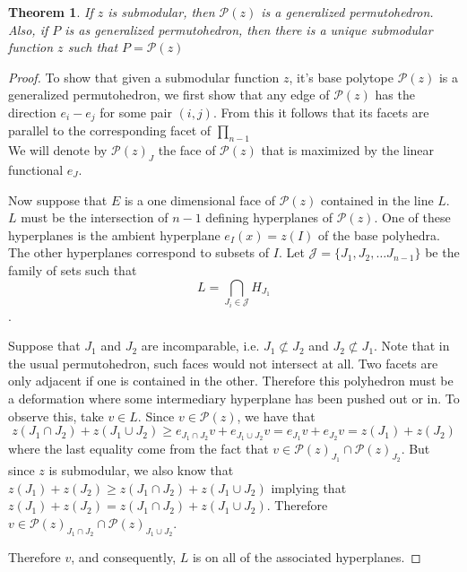 \documentclass[12pt]{amsart}
\newtheorem{theorem}[lemma]{Theorem}
\numberwithin{equation}{section}
\newcommand{\pp}{\mathcal{P}}
\newcommand{\J}{\mathcal{J}}
\newcommand{\jr}[1]{{\color{brown} \sf $\clubsuit\clubsuit\clubsuit$ JR: [#1]}}
\begin{document}
\begin{theorem}
\label{theorem:submodularity}
 If $z$ is submodular, then $\pp(z)$ is a generalized permutohedron.  Also, if $P$ is as generalized permutohedron, then there
is a unique submodular function $z$ such that $P=\pp(z)$ 
\end{theorem}

\begin{proof}

To show that given a submodular function $z$, it's base polytope $\mathcal{P}(z)$ is a generalized permutohedron, 
we first show that any edge of $\mathcal{P}(z)$ has the direction $e_i-e_j$ for some pair $(i,j)$.  From this it follows that its facets are parallel 
to the corresponding facet of $\prod_{n-1}$ \\


  We will denote by $\mathcal{P}(z)_J$
the face of $\mathcal{P}(z)$ that is maximized by the linear functional $e_J$.  

Now suppose that $E$ is a one dimensional face of $\mathcal{P}(z)$ contained in the line $L$.   
$L$ must be the intersection of $n-1$ defining hyperplanes
 of $\mathcal{P}(z)$.   One of these hyperplanes is the ambient hyperplane $e_I( x) = z(I)$ of the base polyhedra.  The other hyperplanes correspond to subsets of $I$.  Let $\mathcal{J} = \{ J_1, J_2, \dots J_{n-1}\} $ be the family of sets such that 
$$L = \bigcap_{J_i\in \J} H_{J_1} $$. 

Suppose that $J_1$ and $J_2$ are incomparable, i.e. $J_1\not\subset J_2$  and $J_2 \not\subset J_1$.   Note that in the usual permutohedron, 
such faces would not intersect at all.   Two facets are only adjacent if one is contained in the other.   Therefore this polyhedron must be a 
deformation where some intermediary hyperplane has been pushed out or in.   
To observe this, take $v\in L$.  Since $v\in \mathcal{P}(z)$, we have
that
$$ z(J_1\cap J_2) + z(J_1\cup J_2) \geq e_{J_1\cap J_2}v  + e_{J_1\cup J_2} v =  e_{J_1}v +  e_{J_2}v = z(J_1) + z(J_2) $$
where the last equality come from the fact that   $v\in\mathcal{P}(z)_{J_1} \cap \mathcal{P}(z)_{J_2}$.
But since $z$ is submodular, we also know that $z(J_1) + z(J_2) \geq z(J_1\cap J_2) + z(J_1\cup J_2)$ implying that
$z(J_1) + z(J_2)=z(J_1\cap J_2) + z(J_1\cup J_2)$.  Therefore $v\in  \mathcal{P}(z)_{J_1\cap J_2}\cap  \mathcal{P}(z)_{J_1\cup J_2} $. 

Therefore $v$, and consequently, $L$ is on all of the associated hyperplanes.

   

\end{proof}
\end{document}
